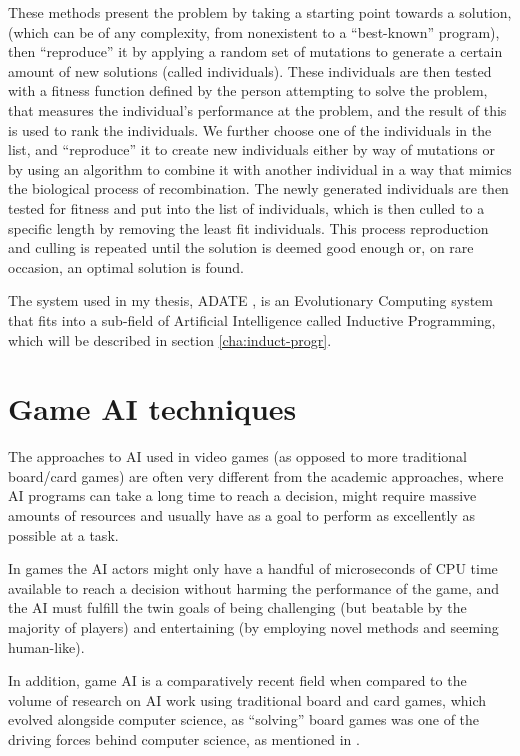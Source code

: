 These methods present the problem by taking a starting point towards a solution,
(which can be of any complexity, from nonexistent to a ``best-known'' program),
then ``reproduce'' it by applying a random set of mutations to generate a
certain amount of new solutions (called individuals). These individuals are then
tested with a fitness function defined by the person attempting to solve the
problem, that measures the individual's performance at the problem, and the
result of this is used to rank the individuals. We further choose one of the
individuals in the list, and ``reproduce'' it to create new individuals either
by way of mutations or by using an algorithm to combine it with another
individual in a way that mimics the biological process of recombination. The
newly generated individuals are then tested for fitness and put into the list of
individuals, which is then culled to a specific length by removing the least fit
individuals. This process reproduction and culling is repeated until the
solution is deemed good enough or, on rare occasion, an optimal solution is
found.

The system used in my thesis, ADATE \citep{olsson1995inductive}, is an
Evolutionary Computing system that fits into a sub-field of Artificial
Intelligence called Inductive Programming, which will be described in section
\ref{cha:induct-progr}.

\section{Game AI techniques}
\label{sec:game-ai-techniques}

The approaches to AI used in video games (as opposed to more traditional
board/card games) are often very different from the academic approaches, where
AI programs can take a long time to reach a decision, might require massive
amounts of resources and usually have as a goal to perform as excellently as
possible at a task.

In games the AI actors might only have a handful of microseconds of CPU time
available to reach a decision without harming the performance of the game, and
the AI must fulfill the twin goals of being challenging (but beatable by the
majority of players) and entertaining (by employing novel methods and seeming
human-like).

In addition, game AI is a comparatively recent field when compared to the volume
of research on AI work using traditional board and card games, which evolved
alongside computer science, as ``solving'' board games was one of the driving
forces behind computer science, as mentioned in \citet{schaeffer2002games}.

